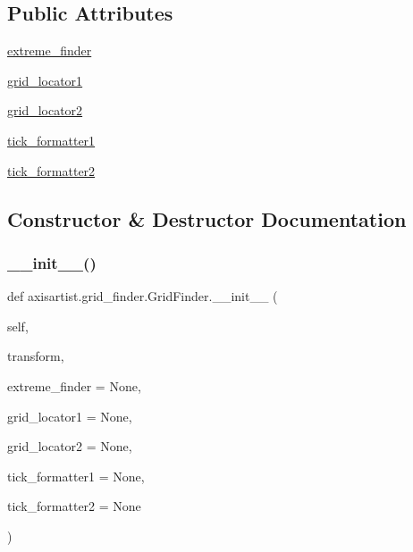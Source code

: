\subsection*{Public Attributes}
\begin{DoxyCompactItemize}
\item 
\hyperlink{classaxisartist_1_1grid__finder_1_1GridFinder_a7dca575c2c13d46cd4fc27f5a1e5cb07}{extreme\+\_\+finder}
\item 
\hyperlink{classaxisartist_1_1grid__finder_1_1GridFinder_abeb0fe9750ba28d2b847e34f9da636d8}{grid\+\_\+locator1}
\item 
\hyperlink{classaxisartist_1_1grid__finder_1_1GridFinder_adfdea1141739ba75d0f67dc30fbc37ab}{grid\+\_\+locator2}
\item 
\hyperlink{classaxisartist_1_1grid__finder_1_1GridFinder_a5bfedc420fc21184b5df572bb7f5f1cc}{tick\+\_\+formatter1}
\item 
\hyperlink{classaxisartist_1_1grid__finder_1_1GridFinder_a23a619043edcf38696552f03e4cb5ae6}{tick\+\_\+formatter2}
\end{DoxyCompactItemize}


\subsection{Constructor \& Destructor Documentation}
\mbox{\label{classaxisartist_1_1grid__finder_1_1GridFinder_adeaa7117f68b85874c1da9c6ec4aa956}} 
\subsubsection{\texorpdfstring{\+\_\+\+\_\+init\+\_\+\+\_\+()}{\_\_init\_\_()}}
{\footnotesize\ttfamily def axisartist.\+grid\+\_\+finder.\+Grid\+Finder.\+\_\+\+\_\+init\+\_\+\+\_\+ (\begin{DoxyParamCaption}\item[{}]{self,  }\item[{}]{transform,  }\item[{}]{extreme\+\_\+finder = {\ttfamily None},  }\item[{}]{grid\+\_\+locator1 = {\ttfamily None},  }\item[{}]{grid\+\_\+locator2 = {\ttfamily None},  }\item[{}]{tick\+\_\+formatter1 = {\ttfamily None},  }\item[{}]{tick\+\_\+formatter2 = {\ttfamily None} }\end{DoxyParamCaption})}

